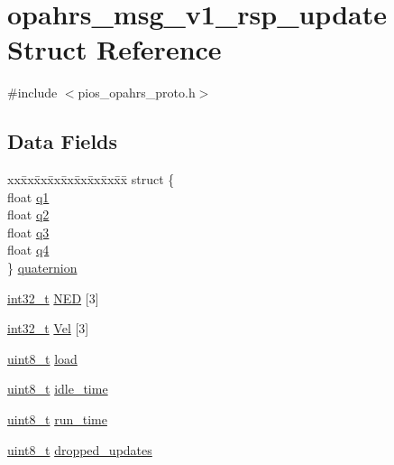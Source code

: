 \hypertarget{structopahrs__msg__v1__rsp__update}{\section{opahrs\-\_\-msg\-\_\-v1\-\_\-rsp\-\_\-update Struct Reference}
\label{structopahrs__msg__v1__rsp__update}
}


{\ttfamily \#include $<$pios\-\_\-opahrs\-\_\-proto.\-h$>$}

\subsection*{Data Fields}
\begin{DoxyCompactItemize}
\item 
\begin{tabbing}
xx\=xx\=xx\=xx\=xx\=xx\=xx\=xx\=xx\=\kill
struct \{\\
\>float \hyperlink{structopahrs__msg__v1__rsp__update_a8e433149205c625f82cb308658580d30}{q1}\\
\>float \hyperlink{structopahrs__msg__v1__rsp__update_a0e734adc08d321d16c95c4e03570c01e}{q2}\\
\>float \hyperlink{structopahrs__msg__v1__rsp__update_ade6006cf35c2d851d58e3c9476543aea}{q3}\\
\>float \hyperlink{structopahrs__msg__v1__rsp__update_af1a9866d8742306019515de9303f2cd6}{q4}\\
\} \hyperlink{structopahrs__msg__v1__rsp__update_ad2180b2f87c7e994cbe4636785ca50b5}{quaternion}\\

\end{tabbing}\item 
\hyperlink{group___n_a_m_e_gafd12020da5a235dfcf0c3c748fb5baed}{int32\-\_\-t} \hyperlink{structopahrs__msg__v1__rsp__update_ac3dbe3978be0c288adc18321145c9267}{N\-E\-D} \mbox{[}3\mbox{]}
\item 
\hyperlink{group___n_a_m_e_gafd12020da5a235dfcf0c3c748fb5baed}{int32\-\_\-t} \hyperlink{structopahrs__msg__v1__rsp__update_a5f8cf56968eeb052030a3e9aaf3e1c52}{Vel} \mbox{[}3\mbox{]}
\item 
\hyperlink{stdint_8h_aba7bc1797add20fe3efdf37ced1182c5}{uint8\-\_\-t} \hyperlink{structopahrs__msg__v1__rsp__update_a9f2f38faae047fc07186b34b9b84e4ef}{load}
\item 
\hyperlink{stdint_8h_aba7bc1797add20fe3efdf37ced1182c5}{uint8\-\_\-t} \hyperlink{structopahrs__msg__v1__rsp__update_aab507b5aac4289faaba5550387d95b98}{idle\-\_\-time}
\item 
\hyperlink{stdint_8h_aba7bc1797add20fe3efdf37ced1182c5}{uint8\-\_\-t} \hyperlink{structopahrs__msg__v1__rsp__update_a393c0a5c96853f390a4060f660841d13}{run\-\_\-time}
\item 
\hyperlink{stdint_8h_aba7bc1797add20fe3efdf37ced1182c5}{uint8\-\_\-t} \hyperlink{structopahrs__msg__v1__rsp__update_abb103a964b5e2270046458e06a6544f6}{dropped\-\_\-updates}
\end{DoxyCompactItemize}


